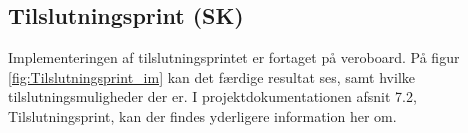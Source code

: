 \subsection{Tilslutningsprint (SK)}

Implementeringen af tilslutningsprintet er fortaget på veroboard. På figur \ref{fig:Tilslutningsprint_im} kan det færdige resultat ses, samt hvilke tilslutningsmuligheder der er. I projektdokumentationen afsnit 7.2, Tilslutningsprint, kan der findes yderligere information her om.  


